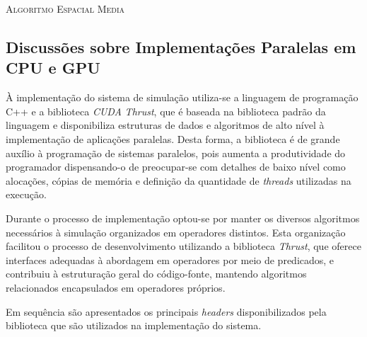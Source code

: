 \begin{algorithm}[H]
  \SetAlgoLined   
  
  \caption{\textsc{Algoritmo Espacial Media}}
  \label{alg:espacial_media}
\end{algorithm}

\subsection{Discussões sobre Implementações Paralelas em CPU e GPU} 

À implementação do sistema de simulação utiliza-se a linguagem de programação C++ e a biblioteca \textit{CUDA} \textit{Thrust}, que é baseada na biblioteca padrão da linguagem e disponibiliza estruturas de dados e algoritmos de alto nível à implementação de aplicações paralelas. Desta forma, a biblioteca é de grande auxílio à programação de sistemas paralelos, pois aumenta a produtividade do programador dispensando-o de preocupar-se com detalhes de baixo nível como alocações, cópias de memória e definição da quantidade de \textit{threads} utilizadas na execução. 

Durante o processo de implementação optou-se por manter os diversos algoritmos necessários à simulação organizados em operadores distintos. Esta organização facilitou o processo de desenvolvimento utilizando a biblioteca \textit{Thrust}, que oferece interfaces adequadas à abordagem em operadores por meio de predicados, e contribuiu à estruturação geral do código-fonte, mantendo algoritmos relacionados encapsulados em operadores próprios. 

Em sequência são apresentados os principais \textit{headers} disponibilizados pela biblioteca que são utilizados na implementação do sistema. 

